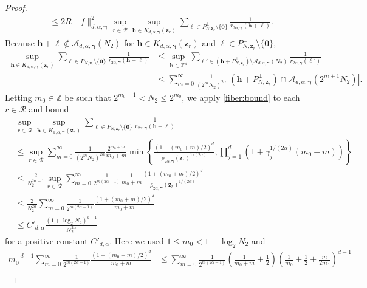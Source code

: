 \documentclass[a4paper,11pt]{article}
\newcommand{\bszero}{\boldsymbol{0}}
\newcommand{\bsh}{\boldsymbol{h}}
\newcommand{\bsl}{\boldsymbol{\ell}}
\newcommand{\bsz}{\boldsymbol{z}}
\newcommand{\bsgamma}{\boldsymbol{\gamma}}
\newcommand{\ZZ}{\mathbb{Z}}
\newcommand{\Acal}{\mathcal{A}}
\begin{document}
\begin{proof}
\begin{align*}
         & \leq 2 R \|f\|^2_{d,\alpha,\bsgamma}  \sup_{r \in \mathcal{R} }\sup_{\bsh\in K_{d,\alpha,\bsgamma}(\bsz_r)} \sum_{\bsl\in P^\perp_{N,\bsz_r}\setminus\{\bszero\} }\frac{1}{r_{2\alpha,\bsgamma}(\bsh+\bsl)}.
    \end{align*}
    Because $\bsh+\bsl\notin \Acal_{d,\alpha,\bsgamma}(N_2)$ for $\bsh\in K_{d,\alpha,\bsgamma}(\bsz_r)$ and $\bsl\in P^\perp_{N,\bsz_r}\setminus\{\bszero\}$,
 \begin{align*}
    \sup_{\bsh\in K_{d,\alpha,\bsgamma}(\bsz_r)} \sum_{\bsl\in P^\perp_{N,\bsz_r}\setminus\{\bszero\} }\frac{1}{r_{2\alpha,\bsgamma}(\bsh+\bsl)} & \leq \sup_{\bsh\in \ZZ^d} \sum_{\bsl'\in (\bsh+ P^\perp_{N,\bsz_r})\setminus \Acal_{d,\alpha,\bsgamma}(N_2)}\frac{1}{r_{2\alpha,\bsgamma}(\bsl')} \\
    & \leq  \sum_{m=0}^\infty \frac{1}{(2^m N_{2})^{2\alpha} } |(\bsh+ P^\perp_{N,\bsz_r})\cap \Acal_{d,\alpha,\bsgamma}(2^{m+1}N_{2})|.    
    \end{align*}
Letting $m_0 \in \mathbb{Z}$ be such that $2^{m_0-1} < N_2 \le 2^{m_0}$, we apply \eqref{fiber:bound} to each $r\in \mathcal{R}$ and bound
   \begin{align}\label{ineq_min}
       & \sup_{r\in \mathcal{R} } \sup_{\bsh \in K_{d,\alpha,\bsgamma}(\bsz_r)} \sum_{\bsl\in P^\perp_{N,\bsz_r}\setminus\{\bszero\} }\frac{1}{r_{2\alpha,\bsgamma}(\bsh+\bsl)} \nonumber \\
       & \leq \sup_{r \in \mathcal{R}} \sum_{m=0}^\infty \frac{1}{(2^m N_{2})^{2\alpha} }   \frac{2^{m_0+m}}{m_0+m} \min \left\{ \frac{(1 + (m_0+m) /2)^d}{\rho_{2 \alpha, \bsgamma}(\bm{z}_r )^{1/(2\alpha) }}, \prod_{j=1}^d (1 + \gamma_j^{1/(2\alpha) } (m_0+m) )  \right\} \nonumber \\ 
       & \leq \frac{2}{N_2^{2\alpha-1}} \sup_{r \in \mathcal{R}} \sum_{m=0}^\infty \frac{1}{ 2^{m (2\alpha-1)}  }   \frac{1}{m_0+m}  \frac{(1 + (m_0+m) /2)^d}{\rho_{2 \alpha, \bsgamma}(\bm{z}_r )^{1/(2\alpha) }}  \\
       & \leq \frac{2}{N_2^{2\alpha}} \sum_{m=0}^\infty \frac{1}{ 2^{m (2\alpha-1)}  }     \frac{(1 + (m_0+m) /2)^d}{ m_0 + m } \nonumber \\
       & \leq C'_{d, \alpha} \frac{ (1+\log_2 N_2)^{d-1}}{N_2^{2 \alpha }} \nonumber
 \end{align}
 for a positive constant $C'_{d, \alpha}$.
  Here we used $1\leq m_0 < 1 +  \log_2 N_2$ and
 \begin{align*}
 m_0^{-d+1} \sum_{m=0}^\infty \frac{1}{ 2^{m (2\alpha-1)}  } \frac{ ( 1 + (m_0+m)/2)^d}{m_0+m} & \leq \sum_{m=0}^\infty \frac{1}{ 2^{m (2\alpha-1)}  } \left(\frac{1}{m_0+m} + \frac{1}{2} \right) \left( \frac{1}{m_0} + \frac{1}{2}+ \frac{m}{2 m_0} \right)^{d-1} \\ 

\end{align*}
\end{proof}
\end{document}
